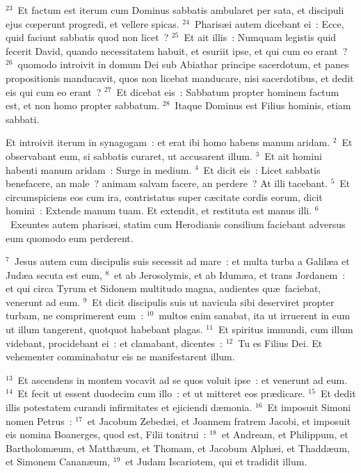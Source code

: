 ${}^{23}$~Et factum est iterum cum Dominus sabbatis ambularet per sata, et discipuli ejus cœperunt progredi, et vellere spicas.
${}^{24}$~Pharis\ae i autem dicebant ei~: Ecce, quid faciunt sabbatis quod non licet~?
${}^{25}$~Et ait illis~: Numquam legistis quid fecerit David, quando necessitatem habuit, et esuriit ipse, et qui cum eo erant~?
${}^{26}$~quomodo introivit in domum Dei sub Abiathar principe sacerdotum, et panes propositionis manducavit, quos non licebat manducare, nisi sacerdotibus, et dedit eis qui cum eo erant~?
${}^{27}$~Et dicebat eis~: Sabbatum propter hominem factum est, et non homo propter sabbatum.
${}^{28}$~Itaque Dominus est Filius hominis, etiam sabbati.

\lettrine[lines=3,image=true,loversize=0.05,lraise=-0.03]{E}{}t introivit iterum in synagogam~: et erat ibi homo habens manum aridam.
${}^{2}$~Et observabant eum, si sabbatis curaret, ut accusarent illum.
${}^{3}$~Et ait homini habenti manum aridam~: Surge in medium.
${}^{4}$~Et dicit eis~: Licet sabbatis benefacere, an male~? animam salvam facere, an perdere~? At illi tacebant.
${}^{5}$~Et circumspiciens eos cum ira, contristatus super c\ae citate cordis eorum, dicit homini~: Extende manum tuam. Et extendit, et restituta est manus illi.
${}^{6}$~Exeuntes autem pharis\ae i, statim cum Herodianis consilium faciebant adversus eum quomodo eum perderent.


${}^{7}$~Jesus autem cum discipulis suis secessit ad mare~: et multa turba a Galil\ae a et Jud\ae a secuta est eum,
${}^{8}$~et ab Jerosolymis, et ab Idum\ae a, et trans Jordanem~: et qui circa Tyrum et Sidonem multitudo magna, audientes qu\ae\ faciebat, venerunt ad eum.
${}^{9}$~Et dicit discipulis suis ut navicula sibi deserviret propter turbam, ne comprimerent eum~:
${}^{10}$~multos enim sanabat, ita ut irruerent in eum ut illum tangerent, quotquot habebant plagas.
${}^{11}$~Et spiritus immundi, cum illum videbant, procidebant ei~: et clamabant, dicentes~:
${}^{12}$~Tu es Filius Dei. Et vehementer comminabatur eis ne manifestarent illum.


${}^{13}$~Et ascendens in montem vocavit ad se quos voluit ipse~: et venerunt ad eum.
${}^{14}$~Et fecit ut essent duodecim cum illo~: et ut mitteret eos pr\ae dicare.
${}^{15}$~Et dedit illis potestatem curandi infirmitates et ejiciendi d\ae monia.
${}^{16}$~Et imposuit Simoni nomen Petrus~:
${}^{17}$~et Jacobum Zebed\ae i, et Joannem fratrem Jacobi, et imposuit eis nomina Boanerges, quod est, Filii tonitrui~:
${}^{18}$~et Andream, et Philippum, et Bartholom\ae um, et Matth\ae um, et Thomam, et Jacobum Alph\ae i, et Thadd\ae um, et Simonem Canan\ae um,
${}^{19}$~et Judam Iscariotem, qui et tradidit illum.


